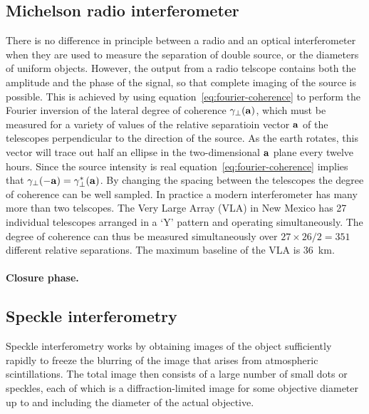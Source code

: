 \subsection{Michelson radio interferometer}

There is no difference in principle between a radio and an optical interferometer when they are used to measure the separation of double source, or the diameters of uniform objects. However, the output from a radio telscope contains both the amplitude and the phase of the signal, so that complete imaging of the source is possible. This is achieved by using equation~\ref{eq:fourier-coherence} to perform the Fourier inversion of the lateral degree of coherence $\gamma_\perp({\bf a})$, which must be measured for a 
variety of values of the relative separatioin vector ${\bf a}$ of the telescopes perpendicular to the direction of the source. As the earth rotates, this vector will trace out half an ellipse in the two-dimensional ${\bf a}$ plane every twelve hours. Since the source intensity is real equation~\ref{eq:fourier-coherence} implies that $\gamma_\perp(-{\bf a})=\gamma_\perp^*({\bf a})$. By changing the spacing between the telescopes the degree of coherence can be well sampled. In practice a modern interferometer has many more than two telscopes. The Very Large Array (VLA) in New Mexico has 27 individual telescopes arranged in a `Y' pattern and operating simultaneously. The degree of coherence can thus be measured simultaneously over 
${27\times 26/2}=351$ different relative separations. The maximum baseline of the VLA is 36~km.

\paragraph{Closure phase.}

\subsection{Speckle interferometry}

Speckle interferometry works by obtaining images of the object sufficiently rapidly to freeze the blurring of the image that arises from atmospheric scintillations. The total image then consists of a large number of small dots or speckles, each of which is a diffraction-limited image for some objective diameter up to and including the diameter of the actual objective.

